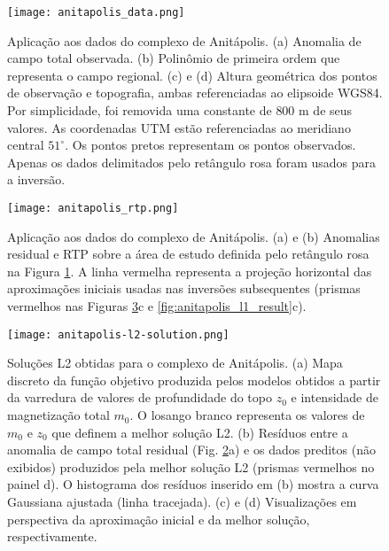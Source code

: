 \pagebreak
\begin{figure}[!htb]
	\texttt{[image: anitapolis\_data.png]}
	\caption{Aplicação aos dados do complexo de Anitápolis. 
		(a) Anomalia de campo total observada.
		(b) Polinômio de primeira ordem que representa o campo regional.
		(c) e (d) Altura geométrica dos pontos de observação e topografia,
		ambas referenciadas ao elipsoide WGS84. Por simplicidade, foi removida uma constante de $800$ m de seus valores. As coordenadas UTM estão referenciadas ao meridiano central $51^{\circ}$. Os pontos pretos representam os pontos observados. Apenas os dados delimitados pelo retângulo rosa foram usados para a inversão. 
	}
	\label{fig:anitapolis_data}
\end{figure}
\pagebreak
\begin{figure}[!htb]
	\texttt{[image: anitapolis\_rtp.png]}
	\caption{Aplicação aos dados do complexo de Anitápolis. 
		(a) e (b) Anomalias residual e RTP sobre a área de estudo definida pelo retângulo rosa na Figura \ref{fig:anitapolis_data}.
		A linha vermelha representa a projeção horizontal das aproximações iniciais usadas nas inversões subsequentes (prismas vermelhos nas Figuras 
		\ref{fig:anitapolis_l2_result}c e \ref{fig:anitapolis_l1_result}c).
	}
	\label{fig:anitapolis_rtp_residual}
\end{figure}

\pagebreak

\begin{figure}[!htb]
	\texttt{[image: anitapolis-l2-solution.png]}
	\caption{Soluções L2 obtidas para o complexo de Anitápolis. 
		(a) Mapa discreto da função objetivo produzida pelos modelos obtidos a partir da varredura de valores de profundidade do topo $z_{0}$ e intensidade de magnetização total $m_{0}$. 
		O losango branco representa os valores de $m_{0}$ e $z_{0}$ que definem a melhor solução L2.
		(b) Resíduos entre a anomalia de campo total residual (Fig. \ref{fig:anitapolis_rtp_residual}a) e os dados preditos (não exibidos) produzidos pela melhor solução L2 (prismas vermelhos no painel d). 
		O histograma dos resíduos inserido em (b) mostra a curva
		Gaussiana ajustada (linha tracejada). 
		(c) e (d) Visualizações em perspectiva da aproximação inicial e da melhor solução, respectivamente.
	}
	\label{fig:anitapolis_l2_result}
\end{figure}

\pagebreak

